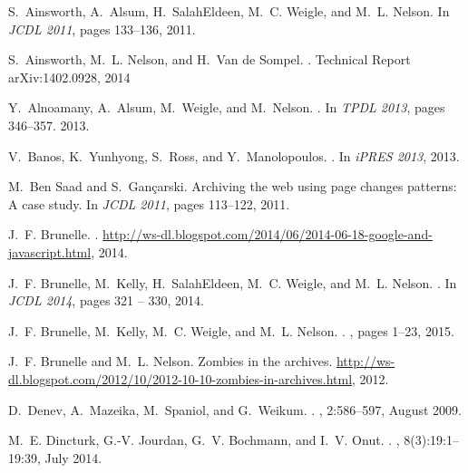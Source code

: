 \documentclass{ipres_proc_article-sp}
\begin{document}

%  
\begin{thebibliography}{10}

S.~Ainsworth, A.~Alsum, H.~SalahEldeen, M.~C. Weigle, and M.~L. Nelson.
\newblock In {\em {JCDL 2011}}, pages 133--136, 2011.

S.~Ainsworth, M.~L. Nelson, and H.~{Van de Sompel}.
.
\newblock Technical Report arXiv:1402.0928, 2014

Y.~Alnoamany, A.~Alsum, M.~Weigle, and M.~Nelson.
.
\newblock In {\em {TPDL 2013}}, pages 346--357. 2013.

V.~Banos, K.~Yunhyong, S.~Ross, and Y.~Manolopoulos.
.
\newblock In {\em iPRES 2013}, 2013.

M.~{Ben Saad} and S.~Gançarski.
\newblock Archiving the web using page changes patterns: A case study.
\newblock In {\em {JCDL 2011}}, pages 113--122, 2011.

J.~F. Brunelle.
.
\newblock
  \url{http://ws-dl.blogspot.com/2014/06/2014-06-18-google-and-javascript.html},
  2014.

J.~F. Brunelle, M.~Kelly, H.~SalahEldeen, M.~C. Weigle, and M.~L. Nelson.
.
\newblock In {\em {JCDL 2014}}, pages 321 -- 330, 2014.

J.~F. Brunelle, M.~Kelly, M.~C. Weigle, and M.~L. Nelson.
.
, pages 1--23, 2015.

J.~F. Brunelle and M.~L. Nelson.
\newblock Zombies in the archives.
\newblock
  \url{http://ws-dl.blogspot.com/2012/10/2012-10-10-zombies-in-archives.html},
  2012.

D.~Denev, A.~Mazeika, M.~Spaniol, and G.~Weikum.
.
, 2:586--597, August 2009.

M.~E. Dincturk, G.-V. Jourdan, G.~V. Bochmann, and I.~V. Onut.
.
, 8(3):19:1--19:39, July 2014.


\end{thebibliography}
\end{document}
